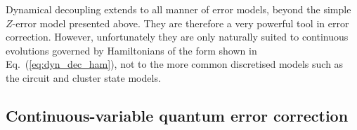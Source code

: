 Dynamical decoupling extends to all manner of error models, beyond the simple $Z$-error model presented above. They are therefore a very powerful tool in error correction. However, unfortunately they are only naturally suited to continuous evolutions governed by Hamiltonians of the form shown in Eq.~(\ref{eq:dyn_dec_ham}), not to the more common discretised models such as the circuit and cluster state models.


%
%

\subsection{Continuous-variable quantum error correction}

